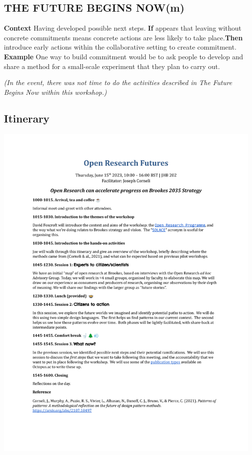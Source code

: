 \documentclass[acmlarge,timestamp]{acmart}
\newcommand{\motor}{(m)}
\begin{document}
\subsection*{THE FUTURE BEGINS NOW{\hfill\motor}}
\textbf{Context} Having developed possible next steps.\newline
\textbf{If} appears that leaving without concrete commitments means
concrete actions are less likely to take place.\newline \textbf{Then}
introduce early actions within the
collaborative setting to create commitment.\newline
\textbf{Example} One way to build commitment would be to ask people to develop and share a method for a small-scale experiment that they plan to carry out.

\smallskip
\noindent \emph{(In the event, there was not time to do the activities described
in {\sc The Future Begins Now} within this workshop.)}
\clearpage

\subsection{Itinerary}

\begin{mdframed}[backgroundcolor=blue!50,linecolor=blue!50]
  \noindent\includegraphics[width=\textwidth,trim={1cm 5.5cm 1cm 4.5cm},clip=true]{brookes}
\end{mdframed}
\end{document}
